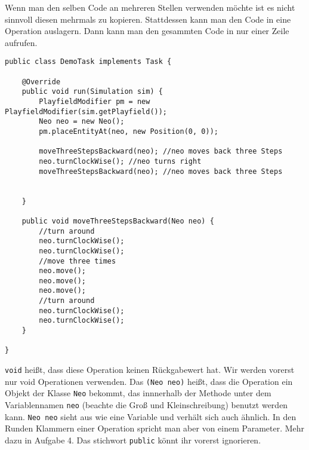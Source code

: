 \begin{Infobox}[Operation]
	Wenn man den selben Code an mehreren Stellen verwenden möchte ist es nicht sinnvoll diesen mehrmals zu kopieren. 
	Stattdessen kann man den Code in eine Operation auslagern. 
	Dann kann man den gesammten Code in nur einer Zeile aufrufen.

	\begin{lstlisting}
public class DemoTask implements Task {
    
    @Override
    public void run(Simulation sim) {
        PlayfieldModifier pm = new PlayfieldModifier(sim.getPlayfield());
        Neo neo = new Neo();
        pm.placeEntityAt(neo, new Position(0, 0));
     
        moveThreeStepsBackward(neo); //neo moves back three Steps
        neo.turnClockWise(); //neo turns right
        moveThreeStepsBackward(neo); //neo moves back three Steps
	
        
    }
    
    public void moveThreeStepsBackward(Neo neo) {
        //turn around
        neo.turnClockWise();
        neo.turnClockWise();
        //move three times
        neo.move();
        neo.move();
        neo.move();
        //turn around
        neo.turnClockWise();
        neo.turnClockWise();
    }
    
}
	\end{lstlisting}

	\lstinline{void} heißt, dass diese Operation keinen Rückgabewert hat. 
	Wir werden vorerst nur void Operationen verwenden. 
	Das \lstinline{(Neo neo)} heißt, dass die Operation ein Objekt der Klasse \lstinline{Neo} bekommt, das innnerhalb der Methode unter dem Variablennamen \lstinline{neo} (beachte die Groß und Kleinschreibung) benutzt werden kann.
	\lstinline{Neo neo} sieht aus wie eine Variable und verhält sich auch ähnlich.
	In den Runden Klammern einer Operation spricht man aber von einem Parameter.
	Mehr dazu in Aufgabe 4. 
	Das stichwort \lstinline{public} könnt ihr vorerst ignorieren.
\end{Infobox}


